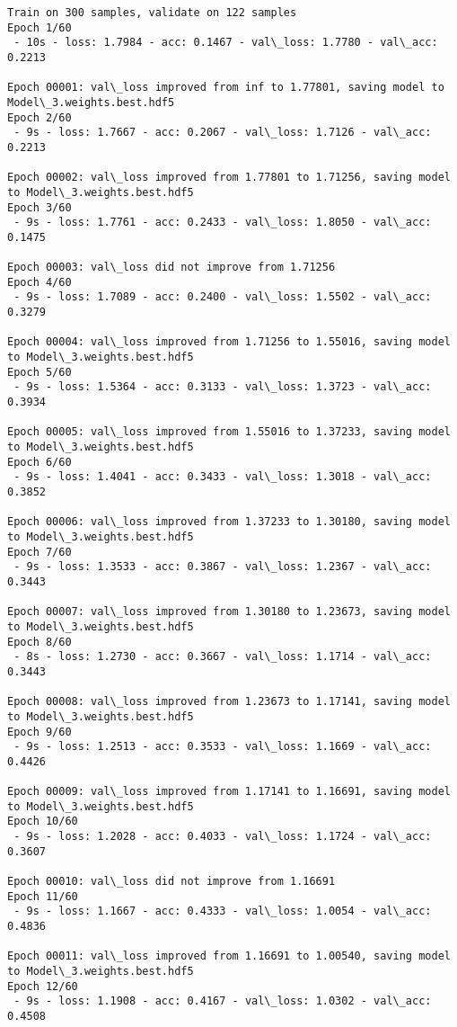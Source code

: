 \documentclass[11pt]{article}
\begin{document}
    \begin{Verbatim}[commandchars=\\\{\}]
Train on 300 samples, validate on 122 samples
Epoch 1/60
 - 10s - loss: 1.7984 - acc: 0.1467 - val\_loss: 1.7780 - val\_acc: 0.2213

Epoch 00001: val\_loss improved from inf to 1.77801, saving model to Model\_3.weights.best.hdf5
Epoch 2/60
 - 9s - loss: 1.7667 - acc: 0.2067 - val\_loss: 1.7126 - val\_acc: 0.2213

Epoch 00002: val\_loss improved from 1.77801 to 1.71256, saving model to Model\_3.weights.best.hdf5
Epoch 3/60
 - 9s - loss: 1.7761 - acc: 0.2433 - val\_loss: 1.8050 - val\_acc: 0.1475

Epoch 00003: val\_loss did not improve from 1.71256
Epoch 4/60
 - 9s - loss: 1.7089 - acc: 0.2400 - val\_loss: 1.5502 - val\_acc: 0.3279

Epoch 00004: val\_loss improved from 1.71256 to 1.55016, saving model to Model\_3.weights.best.hdf5
Epoch 5/60
 - 9s - loss: 1.5364 - acc: 0.3133 - val\_loss: 1.3723 - val\_acc: 0.3934

Epoch 00005: val\_loss improved from 1.55016 to 1.37233, saving model to Model\_3.weights.best.hdf5
Epoch 6/60
 - 9s - loss: 1.4041 - acc: 0.3433 - val\_loss: 1.3018 - val\_acc: 0.3852

Epoch 00006: val\_loss improved from 1.37233 to 1.30180, saving model to Model\_3.weights.best.hdf5
Epoch 7/60
 - 9s - loss: 1.3533 - acc: 0.3867 - val\_loss: 1.2367 - val\_acc: 0.3443

Epoch 00007: val\_loss improved from 1.30180 to 1.23673, saving model to Model\_3.weights.best.hdf5
Epoch 8/60
 - 8s - loss: 1.2730 - acc: 0.3667 - val\_loss: 1.1714 - val\_acc: 0.3443

Epoch 00008: val\_loss improved from 1.23673 to 1.17141, saving model to Model\_3.weights.best.hdf5
Epoch 9/60
 - 9s - loss: 1.2513 - acc: 0.3533 - val\_loss: 1.1669 - val\_acc: 0.4426

Epoch 00009: val\_loss improved from 1.17141 to 1.16691, saving model to Model\_3.weights.best.hdf5
Epoch 10/60
 - 9s - loss: 1.2028 - acc: 0.4033 - val\_loss: 1.1724 - val\_acc: 0.3607

Epoch 00010: val\_loss did not improve from 1.16691
Epoch 11/60
 - 9s - loss: 1.1667 - acc: 0.4333 - val\_loss: 1.0054 - val\_acc: 0.4836

Epoch 00011: val\_loss improved from 1.16691 to 1.00540, saving model to Model\_3.weights.best.hdf5
Epoch 12/60
 - 9s - loss: 1.1908 - acc: 0.4167 - val\_loss: 1.0302 - val\_acc: 0.4508


\end{Verbatim}
\end{document}
